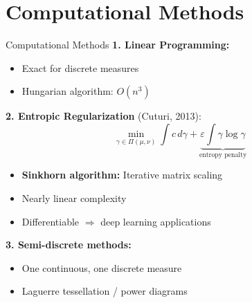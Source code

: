\documentclass[aspectratio=169]{beamer}
\begin{document}
\section{Computational Methods}

\begin{frame}{Computational Methods}
\textbf{1. Linear Programming:}
\begin{itemize}
    \item Exact for discrete measures
    \item Hungarian algorithm: $O(n^3)$
\end{itemize}

\vspace{0.3cm}
\textbf{2. Entropic Regularization} (Cuturi, 2013):
\[
\min_{\gamma \in \Pi(\mu,\nu)} \int c \, d\gamma + \underbrace{\varepsilon \int \gamma \log \gamma}_{\text{entropy penalty}}
\]

\begin{itemize}
    \item \textbf{Sinkhorn algorithm:} Iterative matrix scaling
    \item Nearly linear complexity
    \item Differentiable $\Rightarrow$ deep learning applications
\end{itemize}

\vspace{0.3cm}
\textbf{3. Semi-discrete methods:}
\begin{itemize}
    \item One continuous, one discrete measure
    \item Laguerre tessellation / power diagrams
\end{itemize}
\end{frame}
\end{document}
